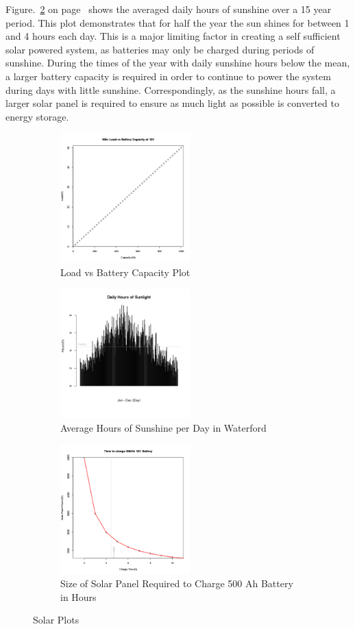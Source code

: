Figure.~\ref{fig:barplot_hours_sunshine_waterford} on page~\pageref{fig:barplot_hours_sunshine_waterford} shows the averaged daily hours of sunshine over a 15 year period. This plot demonstrates that for half the year the sun shines for between 1 and 4 hours each day. This is a major limiting factor in creating a self sufficient solar powered system, as batteries may only be charged during periods of sunshine. During the times of the year with daily sunshine hours below the mean, a larger battery capacity is required in order to continue to power the system during days with little sunshine. Correspondingly, as the sunshine hours fall, a larger solar panel is required to ensure as much light as possible is converted to energy storage.

%
\begin{figure}	
	\centering
	\begin{subfigure}[t]{5cm}
		\centering
		\includegraphics[width=5cm]{images/64}
		\caption{Load vs Battery Capacity Plot}
		\label{fig:lineplot_load_battery_capacity}		
	\end{subfigure}
	\quad
	\begin{subfigure}[t]{5cm}
		\centering
		\includegraphics[width=5cm]{images/66}
		\caption{Average Hours of Sunshine per Day in Waterford}
		\label{fig:barplot_hours_sunshine_waterford}
	\end{subfigure}
	\quad
	\begin{subfigure}[t]{5cm}
		\centering
		\includegraphics[width=5cm]{images/65}
		\caption{Size of Solar Panel Required to Charge 500 Ah Battery in Hours}
		\label{fig:lineplot_solar_panel_battery_capacity_hours}
	\end{subfigure}
	\caption{Solar Plots}
	\label{fig:solar_plots}
\end{figure}
%


